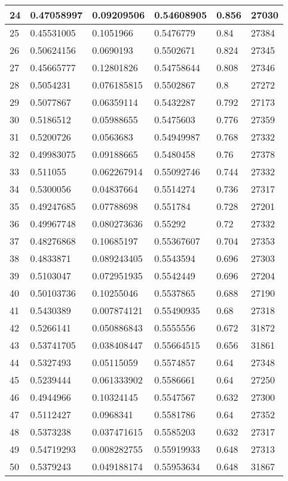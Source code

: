 \begin{longtable}{|l|l|l|l|l|l|}
24 & 0.47058997 & 0.09209506 & 0.54608905 & 0.856 & 27030 \\ \hline 
25 & 0.45531005 & 0.1051966 & 0.5476779 & 0.84 & 27384 \\ \hline 
26 & 0.50624156 & 0.0690193 & 0.5502671 & 0.824 & 27345 \\ \hline 
27 & 0.45665777 & 0.12801826 & 0.54758644 & 0.808 & 27346 \\ \hline 
28 & 0.5054231 & 0.076185815 & 0.5502867 & 0.8 & 27272 \\ \hline 
29 & 0.5077867 & 0.06359114 & 0.5432287 & 0.792 & 27173 \\ \hline 
30 & 0.5186512 & 0.05988655 & 0.5475603 & 0.776 & 27359 \\ \hline 
31 & 0.5200726 & 0.0563683 & 0.54949987 & 0.768 & 27332 \\ \hline 
32 & 0.49983075 & 0.09188665 & 0.5480458 & 0.76 & 27378 \\ \hline 
33 & 0.511055 & 0.062267914 & 0.55092746 & 0.744 & 27332 \\ \hline 
34 & 0.5300056 & 0.04837664 & 0.5514274 & 0.736 & 27317 \\ \hline 
35 & 0.49247685 & 0.07788698 & 0.551784 & 0.728 & 27201 \\ \hline 
36 & 0.49967748 & 0.080273636 & 0.55292 & 0.72 & 27332 \\ \hline 
37 & 0.48276868 & 0.10685197 & 0.55367607 & 0.704 & 27353 \\ \hline 
38 & 0.4833871 & 0.089243405 & 0.5543594 & 0.696 & 27303 \\ \hline 
39 & 0.5103047 & 0.072951935 & 0.5542449 & 0.696 & 27204 \\ \hline 
40 & 0.50103736 & 0.10255046 & 0.5537865 & 0.688 & 27190 \\ \hline 
41 & 0.5430389 & 0.007874121 & 0.55490935 & 0.68 & 27318 \\ \hline 
42 & 0.5266141 & 0.050886843 & 0.5555556 & 0.672 & 31872 \\ \hline 
43 & 0.53741705 & 0.038408447 & 0.55664515 & 0.656 & 31861 \\ \hline 
44 & 0.5327493 & 0.05115059 & 0.5574857 & 0.64 & 27348 \\ \hline 
45 & 0.5239444 & 0.061333902 & 0.5586661 & 0.64 & 27250 \\ \hline 
46 & 0.4944966 & 0.10324145 & 0.5547567 & 0.632 & 27300 \\ \hline 
47 & 0.5112427 & 0.0968341 & 0.5581786 & 0.64 & 27352 \\ \hline 
48 & 0.5373238 & 0.037471615 & 0.5585203 & 0.632 & 27317 \\ \hline 
49 & 0.54719293 & 0.008282755 & 0.55919933 & 0.648 & 27313 \\ \hline 
50 & 0.5379243 & 0.049188174 & 0.55953634 & 0.648 & 31867 \\ \hline 
\end{longtable}